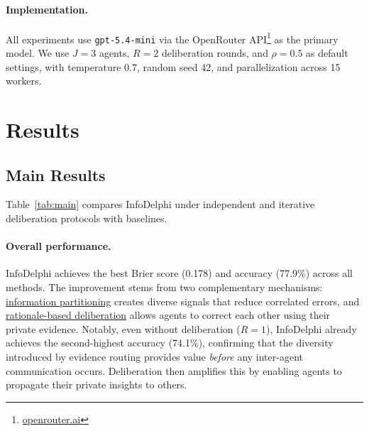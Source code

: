 \documentclass[11pt]{article}
\theoremstyle{plain}
\theoremstyle{definition}
\begin{document}
\paragraph{Implementation.}
All experiments use \texttt{gpt-5.4-mini} via the OpenRouter API\footnote{\href{https://openrouter.ai/}{openrouter.ai}} as the primary model.
We use $J=3$ agents, $R=2$ deliberation rounds, and $\rho=0.5$ as default settings, with temperature 0.7, random seed 42, and parallelization across 15 workers.

\section{Results}
\label{sec:results}

\subsection{Main Results}

Table~\ref{tab:main} compares InfoDelphi under independent and iterative deliberation protocols with baselines.

\paragraph{ Overall performance.}
InfoDelphi achieves the best Brier score (0.178) and accuracy (77.9\%) across all methods.
The improvement stems from two complementary mechanisms: \uline{information partitioning} creates diverse signals that reduce correlated errors, and \uline{rationale-based deliberation} allows agents to correct each other using their private evidence.
Notably, even without deliberation ($R{=}1$), InfoDelphi already achieves the second-highest accuracy (74.1\%), confirming that the diversity introduced by evidence routing provides value \textit{before} any inter-agent communication occurs.
Deliberation then amplifies this by enabling agents to propagate their private insights to others.

\end{document}
